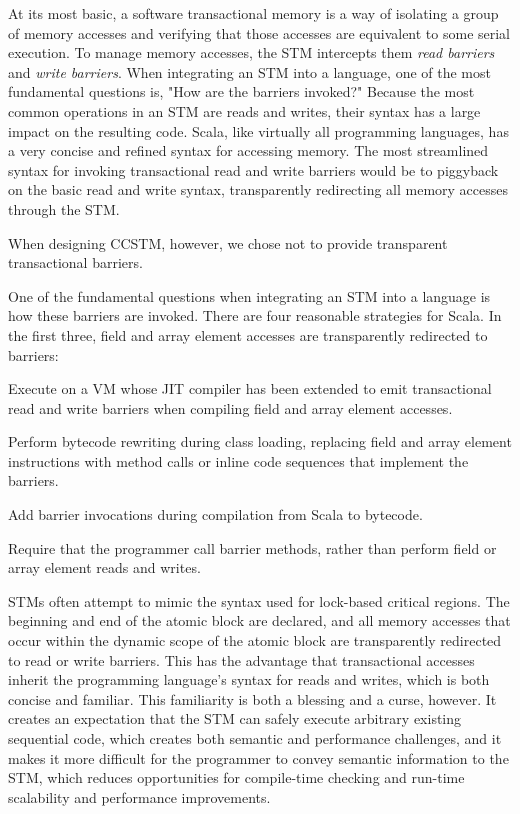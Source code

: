 
At its most basic, a software transactional memory is a way of isolating a
group of memory accesses and verifying that those accesses are equivalent
to some serial execution.  To manage memory accesses, the STM intercepts
them \textit{read barriers} and \textit{write barriers}.  When integrating an
STM into a language, one of the most fundamental questions is, "How are the
barriers invoked?" Because the most common operations in an STM are reads and
writes, their syntax has a large impact on the resulting code.
Scala, like virtually all programming languages, has a very concise and
refined syntax for accessing memory.  The most streamlined syntax for
invoking transactional read and write barriers would be to piggyback on
the basic read and write syntax, transparently redirecting all memory
accesses through the STM.

When designing CCSTM, however, we chose not to provide transparent
transactional barriers.



One of the
fundamental questions when integrating an STM into a language is how these
barriers are invoked.  There are four reasonable strategies for Scala.  In the
first three, field and array element accesses are transparently redirected to
barriers:
\begin{packed_enum}

\item Execute on a VM whose JIT compiler has been extended to emit
transactional read and write barriers when compiling field and array element
accesses.

\item Perform bytecode rewriting during class loading, replacing field and
array element instructions with method calls or inline code sequences that
implement the barriers.

\item Add barrier invocations during compilation from Scala to bytecode.

\item Require that the programmer call barrier methods, rather than perform
field or array element reads and writes.

\end{packed_enum}

STMs often attempt to mimic the syntax used for lock-based critical
regions.  The beginning and end of the atomic block are declared, and all
memory accesses that occur within the dynamic scope of the atomic block
are transparently redirected to read or write barriers.  This has the
advantage that transactional accesses inherit the programming language's
syntax for reads and writes, which is both concise and familiar.
This familiarity is both a blessing and a curse, however.  It creates an
expectation that the STM can safely execute arbitrary existing sequential
code, which creates both semantic and performance challenges, and it
makes it more difficult for the programmer to convey semantic information
to the STM, which reduces opportunities for compile-time checking and
run-time scalability and performance improvements.

